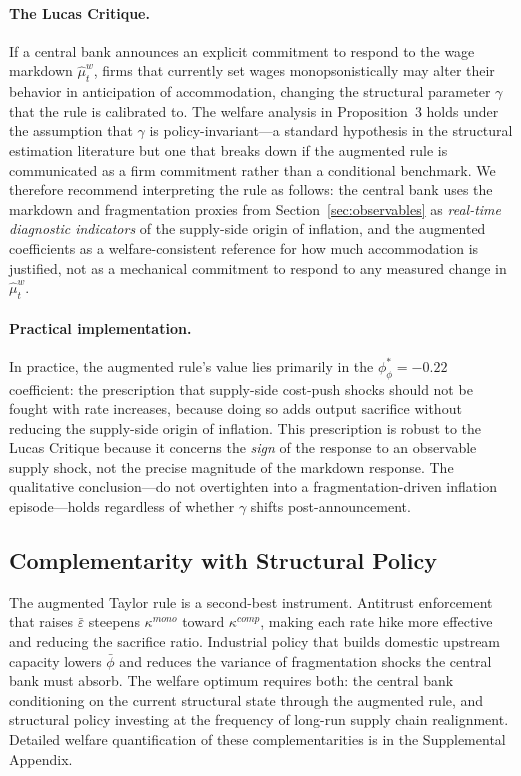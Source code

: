 \paragraph{The Lucas Critique.}
If a central bank announces an explicit commitment to respond to the wage
markdown $\hat\mu_t^w$, firms that currently set wages monopsonistically
may alter their behavior in anticipation of accommodation, changing the
structural parameter $\gamma$ that the rule is calibrated to. The welfare
analysis in Proposition~3 holds under the assumption that $\gamma$ is
policy-invariant---a standard hypothesis in the structural estimation
literature but one that breaks down if the augmented rule is communicated
as a firm commitment rather than a conditional benchmark. We therefore
recommend interpreting the rule as follows: the central bank uses the
markdown and fragmentation proxies from Section~\ref{sec:observables}
as \emph{real-time diagnostic indicators} of the supply-side origin of
inflation, and the augmented coefficients as a welfare-consistent reference
for how much accommodation is justified, not as a mechanical commitment
to respond to any measured change in $\hat\mu_t^w$.

\paragraph{Practical implementation.}
In practice, the augmented rule's value lies primarily in the $\phi_\phi^*
= -0.22$ coefficient: the prescription that supply-side cost-push shocks
should not be fought with rate increases, because doing so adds output
sacrifice without reducing the supply-side origin of inflation. This
prescription is robust to the Lucas Critique because it concerns the
\emph{sign} of the response to an observable supply shock, not the precise
magnitude of the markdown response. The qualitative conclusion---do not
overtighten into a fragmentation-driven inflation episode---holds regardless
of whether $\gamma$ shifts post-announcement.

\subsection{Complementarity with Structural Policy}

The augmented Taylor rule is a second-best instrument. Antitrust enforcement
that raises $\bar\varepsilon$ steepens $\kappa^{mono}$ toward $\kappa^{comp}$,
making each rate hike more effective and reducing the sacrifice ratio.
Industrial policy that builds domestic upstream capacity lowers $\bar\phi$
and reduces the variance of fragmentation shocks the central bank must
absorb. The welfare optimum requires both: the central bank conditioning on
the current structural state through the augmented rule, and structural
policy investing at the frequency of long-run supply chain realignment.
Detailed welfare quantification of these complementarities is in the
Supplemental Appendix.
